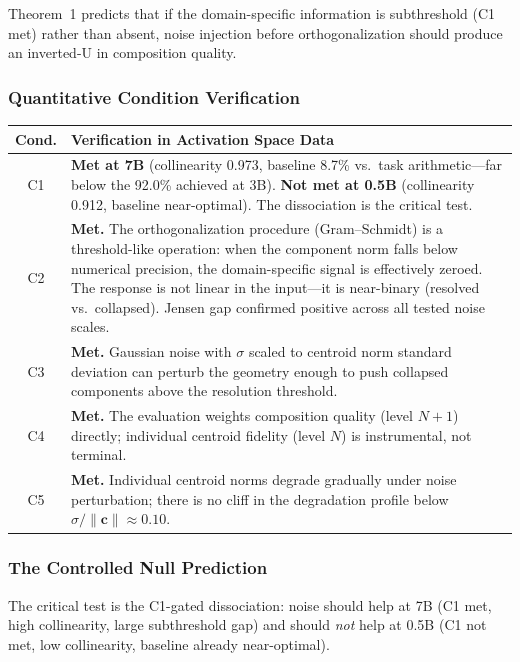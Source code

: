 \documentclass[12pt,letterpaper]{article}
\theoremstyle{definition}
\theoremstyle{remark}
\begin{document}
Theorem~1 predicts that if the domain-specific information is subthreshold (C1 met) rather than absent, noise injection before orthogonalization should produce an inverted-U in composition quality.

\subsubsection{Quantitative Condition Verification}

\begin{center}
\begin{tabular}{@{}cp{10.5cm}@{}}
\toprule
\textbf{Cond.} & \textbf{Verification in Activation Space Data} \\
\midrule
C1 & \textbf{Met at 7B} (collinearity 0.973, baseline 8.7\% vs.\ task arithmetic---far below the 92.0\% achieved at 3B). \textbf{Not met at 0.5B} (collinearity 0.912, baseline near-optimal). The dissociation is the critical test. \\
C2 & \textbf{Met.} The orthogonalization procedure (Gram--Schmidt) is a threshold-like operation: when the component norm falls below numerical precision, the domain-specific signal is effectively zeroed. The response is not linear in the input---it is near-binary (resolved vs.\ collapsed). Jensen gap confirmed positive across all tested noise scales. \\
C3 & \textbf{Met.} Gaussian noise with $\sigma$ scaled to centroid norm standard deviation can perturb the geometry enough to push collapsed components above the resolution threshold. \\
C4 & \textbf{Met.} The evaluation weights composition quality (level $N{+}1$) directly; individual centroid fidelity (level $N$) is instrumental, not terminal. \\
C5 & \textbf{Met.} Individual centroid norms degrade gradually under noise perturbation; there is no cliff in the degradation profile below $\sigma/\|\mathbf{c}\| \approx 0.10$. \\
\bottomrule
\end{tabular}
\end{center}

\subsubsection{The Controlled Null Prediction}

The critical test is the C1-gated dissociation: noise should help at 7B (C1 met, high collinearity, large subthreshold gap) and should \emph{not} help at 0.5B (C1 not met, low collinearity, baseline already near-optimal).
\end{document}
